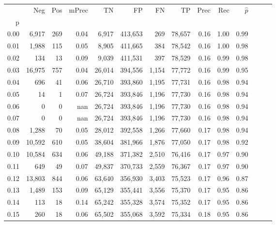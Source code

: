 \begin{tabular}{rrrrrrrrrrrrrr}
\toprule
{} &     Neg &    Pos & mPrec &       TN &       FP &      FN &      TP &  Prec &   Rec & $\hat{p}$ \\
p    &         &        &       &          &          &         &         &       &       &           \\
\midrule
0.00 &   6,917 &    269 &  0.04 &    6,917 &  413,653 &     269 &  78,657 &  0.16 &  1.00 &      0.99 \\
0.01 &   1,988 &    115 &  0.05 &    8,905 &  411,665 &     384 &  78,542 &  0.16 &  1.00 &      0.98 \\
0.02 &     134 &     13 &  0.09 &    9,039 &  411,531 &     397 &  78,529 &  0.16 &  0.99 &      0.98 \\
0.03 &  16,975 &    757 &  0.04 &   26,014 &  394,556 &   1,154 &  77,772 &  0.16 &  0.99 &      0.95 \\
0.04 &     696 &     41 &  0.06 &   26,710 &  393,860 &   1,195 &  77,731 &  0.16 &  0.98 &      0.94 \\
0.05 &      14 &      1 &  0.07 &   26,724 &  393,846 &   1,196 &  77,730 &  0.16 &  0.98 &      0.94 \\
0.06 &       0 &      0 &   nan &   26,724 &  393,846 &   1,196 &  77,730 &  0.16 &  0.98 &      0.94 \\
0.07 &       0 &      0 &   nan &   26,724 &  393,846 &   1,196 &  77,730 &  0.16 &  0.98 &      0.94 \\
0.08 &   1,288 &     70 &  0.05 &   28,012 &  392,558 &   1,266 &  77,660 &  0.17 &  0.98 &      0.94 \\
0.09 &  10,592 &    610 &  0.05 &   38,604 &  381,966 &   1,876 &  77,050 &  0.17 &  0.98 &      0.92 \\
0.10 &  10,584 &    634 &  0.06 &   49,188 &  371,382 &   2,510 &  76,416 &  0.17 &  0.97 &      0.90 \\
0.11 &     649 &     49 &  0.07 &   49,837 &  370,733 &   2,559 &  76,367 &  0.17 &  0.97 &      0.90 \\
0.12 &  13,803 &    844 &  0.06 &   63,640 &  356,930 &   3,403 &  75,523 &  0.17 &  0.96 &      0.87 \\
0.13 &   1,489 &    153 &  0.09 &   65,129 &  355,441 &   3,556 &  75,370 &  0.17 &  0.95 &      0.86 \\
0.14 &     113 &     18 &  0.14 &   65,242 &  355,328 &   3,574 &  75,352 &  0.17 &  0.95 &      0.86 \\
0.15 &     260 &     18 &  0.06 &   65,502 &  355,068 &   3,592 &  75,334 &  0.18 &  0.95 &      0.86 \\

\end{tabular}
